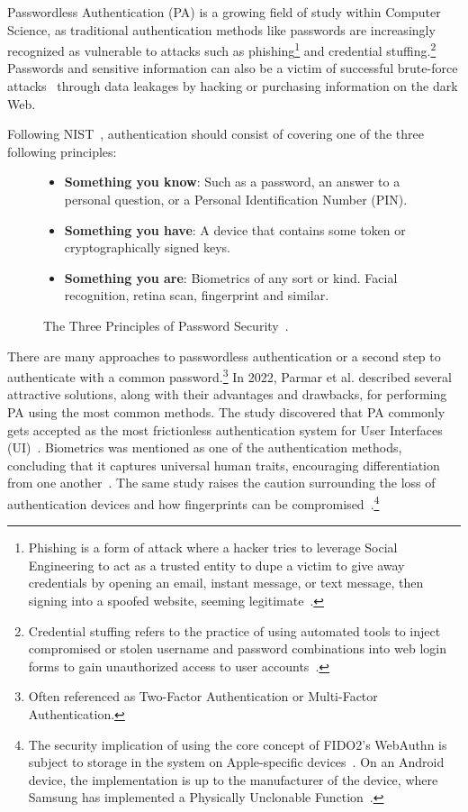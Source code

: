 Passwordless Authentication (PA) is a growing field of study within Computer
Science, as traditional authentication methods like passwords are increasingly
recognized as vulnerable to attacks such as phishing\footnote{
  Phishing is a form of attack where a hacker tries to leverage Social
  Engineering to act as a trusted entity to dupe a victim to give away
  credentials by opening an email, instant message, or text message, then
  signing into a spoofed website, seeming legitimate~\cite{ripa2021emergence}.
} and credential stuffing.\footnote{
  Credential stuffing refers to the practice of using automated tools to
  inject compromised or stolen username and password combinations into web login
  forms to gain unauthorized access to user accounts~\cite{owasp-credential-stuffing}.
}
Passwords and sensitive information can also be a victim of successful
brute-force attacks~\cite{bonneau2012science} through data leakages by hacking
or purchasing information on the dark Web.

Following NIST~\cite{NIST:SP:800-171r2, NISTSP800-63-3}, authentication should
consist of covering one of the three following principles:

\begin{figure}[htbp]
  \begin{itemize}
    \item \textbf{Something you know}:
    Such as a password, an answer to a personal question, or a Personal
    Identification Number (PIN).
    \item \textbf{Something you have}:
    A device that contains some token or cryptographically signed keys.
    \item \textbf{Something you are}:
    Biometrics of any sort or kind.
    Facial recognition, retina scan, fingerprint and similar.
  \end{itemize}
  \caption{The Three Principles of Password Security~\cite{schneier2000secrets, NIST:SP:800-171r2}.}
  \label{fig:secprinciples}
\end{figure}

There are many approaches to passwordless authentication or a second
step to authenticate with a common password.\footnote{
  Often referenced as Two-Factor Authentication or Multi-Factor Authentication.
}
In 2022, Parmar et al.\cite{parmar2022} described several attractive solutions, along with their advantages and drawbacks, for performing PA using the most common methods.
The study discovered that PA commonly gets accepted as the most frictionless authentication system for User Interfaces (UI)~\cite{parmar2022}.
Biometrics was mentioned as one of the authentication methods, concluding that it captures universal human traits, encouraging differentiation from one another~\cite{parmar2022}.
The same study raises the caution surrounding the loss of authentication devices and how fingerprints can be compromised~\cite{parmar2022}.\footnote{
  The security implication of using the core concept of FIDO2's WebAuthn is subject to storage in the system on Apple-specific devices~\cite{appleSecureEnclave}.
  On an Android device, the implementation is up to the manufacturer of the device, where Samsung has implemented a Physically Unclonable
  Function~\cite{lee2021samsung}.
}

